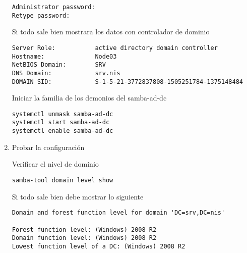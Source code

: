 \documentclass[../main.tex]{subfiles}
\begin{document}
\begin{enumerate}
    \begin{listing}[H]
  \begin{verbatim}
Administrator password:
Retype password:
\end{verbatim}
\end{listing}

    Si todo sale bien mostrara los datos con controlador de dominio

    \begin{listing}[H]
  \begin{verbatim}
Server Role:           active directory domain controller
Hostname:              Node03
NetBIOS Domain:        SRV
DNS Domain:            srv.nis
DOMAIN SID:            S-1-5-21-3772837808-1505251784-1375148484
\end{verbatim}
\end{listing}

    Iniciar la familia de los demonios del samba-ad-dc

    \begin{listing}[H]
  \begin{verbatim}
systemctl unmask samba-ad-dc
systemctl start samba-ad-dc
systemctl enable samba-ad-dc
\end{verbatim}
\end{listing}

    
  \item Probar la configuración

    Verificar el nivel de dominio

    \begin{listing}[H]
  \begin{verbatim}
samba-tool domain level show
\end{verbatim}
\end{listing}

    Si todo sale bien debe mostrar lo siguiente

    \begin{listing}[H]
  \begin{verbatim}
Domain and forest function level for domain 'DC=srv,DC=nis'

Forest function level: (Windows) 2008 R2
Domain function level: (Windows) 2008 R2
Lowest function level of a DC: (Windows) 2008 R2
\end{verbatim}
\end{listing}


\end{enumerate}
\end{document}
